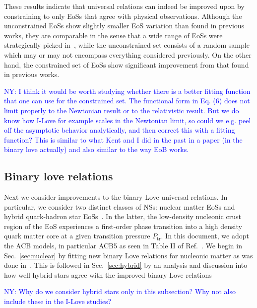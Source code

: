 \documentclass[prd,twocolumn,nofootinbib,superscriptaddress,amsmath,amssymb]{revtex4-1}
\newcommand{\ny}[1]{\textcolor{blue}{NY: #1} }
\begin{document}
These results indicate that universal relations can indeed be improved upon by constraining to only EoSs that agree with physical observations.
Although the unconstrained EoSs show slightly smaller EoS variation than found in previous works, they are comparable in the sense that a wide range of EoSs were strategically picked in~\cite{Yagi:ILQ}, while the unconstrained set consists of a random sample which may or may not encompass everything considered previously.
On the other hand, the constrained set of EoSs show significant improvement from that found in previous 
works.

{\ny{I think it would be worth studying whether there is a better fitting function that one can use for the constrained set. The functional form in Eq. (6) does not limit properly to the Newtonian result or to the relativistic result. But we do know how I-Love for example scales in the Newtonian limit, so could we e.g. peel off the asymptotic behavior analytically, and then correct this with a fitting function? This is similar to what Kent and I did in the past in a paper (in the binary love actually) and also similar to the way EoB works.}}

\subsection{Binary love relations}\label{sec:binary}
Next we consider improvements to the binary Love universal relations.
In particular, we consider two distinct classes of NSs: nuclear matter EoSs and hybrid quark-hadron star EoSs~\cite{Paschalidis2018,Alford:2017qgh,1971SvA....15..347S,Zdunik:2012dj,Alford:2013aca}.
In the latter, the low-density nucleonic crust region of the EoS experiences a first-order phase transition into a high density quark matter core at a given transition pressure $P_{\text{tr}}$.
In this document, we adopt the ACB models, in particular ACB5 as seen in Table II of Ref.~\cite{Paschalidis2018}.
We begin in Sec.~\ref{sec:nuclear} by fitting new binary Love relations for nucleonic matter as was done in~\cite{Yagi:binLove}.
This is followed in Sec.~\ref{sec:hybrid} by an analysis and discussion into how well hybrid stars agree with the improved binary Love relations

{\ny{Why do we consider hybrid stars only in this subsection? Why not also include these in the I-Love studies?}}
\end{document}
